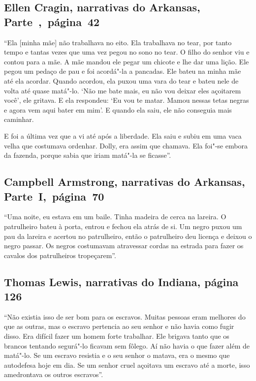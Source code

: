 \subsection{Ellen Cragin, narrativas do Arkansas, Parte~,~página~42} \label{ref59}

``Ela {[}minha mãe{]} não trabalhava no eito. Ela trabalhava no tear,
por tanto tempo e tantas vezes que uma vez pegou no sono no tear. O
filho do senhor viu e contou para a mãe. A mãe mandou ele pegar um
chicote e lhe dar uma lição. Ele pegou um pedaço de pau e foi acordá"-la
a pancadas. Ele bateu na minha mãe até ela acordar. Quando acordou, ela
puxou uma vara do tear e bateu nele de volta até quase matá"-lo. `Não me
bate mais, eu não vou deixar eles açoitarem você', ele gritava. E ela
respondeu: `Eu vou te matar. Mamou nessas tetas negras e agora vem aqui
bater em mim'. E quando ela saiu, ele não conseguia mais caminhar.

E foi a última vez que a vi até após a liberdade. Ela saiu e subiu em
uma vaca velha que costumava ordenhar. Dolly, era assim que chamava. Ela
foi"-se embora da fazenda, porque sabia que iriam matá"-la se ficasse''.

\subsection{Campbell Armstrong, narrativas do Arkansas, Parte~I,~página~70} \label{ref12}

``Uma noite, eu estava em um baile. Tinha madeira de cerca na lareira. O
patrulheiro bateu à porta, entrou e fechou ela atrás de si. Um negro
puxou um pau da lareira e acertou no patrulheiro, então o patrulheiro
deu licença e deixou o negro passar. Os negros costumavam atravessar
cordas na estrada para fazer os cavalos dos patrulheiros tropeçarem''.

\subsection{Thomas Lewis, narrativas do Indiana, página 126}
\label{ref178}

``Não existia isso de ser bom para os escravos. Muitas pessoas eram
melhores do que as outras, mas o escravo pertencia ao seu senhor e não
havia como fugir disso. Era difícil fazer um homem forte trabalhar. Ele
brigava tanto que os brancos tentando segurá"-lo ficavam sem fôlego. Aí
não havia o que fazer além de matá"-lo. Se um escravo resistia e o seu
senhor o matava, era o mesmo que autodefesa hoje em dia. Se um senhor
cruel açoitava um escravo até a morte, isso amedrontava os outros
escravos''.

